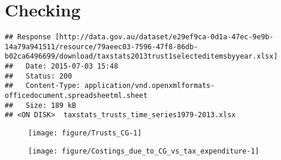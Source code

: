 \documentclass{grattan}\usepackage[]{graphicx}\usepackage[]{color}
\makeatletter
\newenvironment{kframe}{%
 \def\at@end@of@kframe{}%
 \ifinner\ifhmode%
  \def\at@end@of@kframe{\end{minipage}}%
  \begin{minipage}{\columnwidth}%
 \fi\fi%
 \def\FrameCommand##1{\hskip\@totalleftmargin \hskip-\fboxsep
 \colorbox{shadecolor}{##1}\hskip-\fboxsep
     \hskip-\linewidth \hskip-\@totalleftmargin \hskip\columnwidth}%
 \MakeFramed {\advance\hsize-\width
   \@totalleftmargin\z@ \linewidth\hsize
   \@setminipage}}%
 {\par\unskip\endMakeFramed%
 \at@end@of@kframe}
\newenvironment{knitrout}{}{} %
\makeatother
\begin{document}
\chapter{Checking}


\begin{knitrout}
\color{fgcolor}\begin{kframe}
\begin{verbatim}
## Response [http://data.gov.au/dataset/e29ef9ca-0d1a-47ec-9e9b-14a79a941511/resource/79aeec03-7596-47f8-86db-b02ca6496699/download/taxstats2013trust1selecteditemsbyyear.xlsx]
##   Date: 2015-07-03 15:48
##   Status: 200
##   Content-Type: application/vnd.openxmlformats-officedocument.spreadsheetml.sheet
##   Size: 189 kB
## <ON DISK>  taxstats_trusts_time_series1979-2013.xlsx
\end{verbatim}
\end{kframe}
\end{knitrout}


\begin{figure}
\texttt{[image: figure/Trusts\_CG-1]}
\notes{}

\end{figure}


\begin{figure}
\texttt{[image: figure/Costings\_due\_to\_CG\_vs\_tax\_expenditure-1]}
\notes{}
\end{figure}
\end{document}
